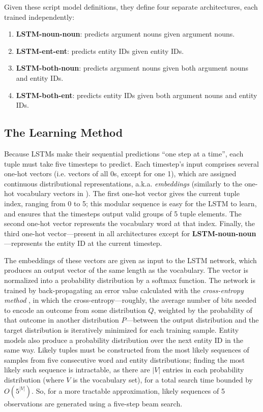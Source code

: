 Given these script model definitions, they define four separate architectures, each trained independently:

\begin{enumerate}
    \item \textbf{LSTM-noun-noun}: predicts argument nouns given argument nouns.
    \item \textbf{LSTM-ent-ent}: predicts entity IDs given entity IDs.
    \item \textbf{LSTM-both-noun}: predicts argument nouns given both argument nouns and entity IDs.
    \item \textbf{LSTM-both-ent}: predicts entity IDs given both argument nouns and entity IDs.
\end{enumerate}

\subsection{The Learning Method}
Because LSTMs make their sequential predictions ``one step at a time'', each tuple must take five timesteps to predict. Each timestep's input comprises several one-hot vectors (i.e. vectors of all 0s, except for one 1), which are assigned continuous distributional representations, a.k.a. \textit{embeddings} (similarly to the one-hot vocabulary vectors in \citep{mikolov2013}). The first one-hot vector gives the current tuple index, ranging from 0 to 5; this modular sequence is easy for the LSTM to learn, and ensures that the timesteps output valid groups of 5 tuple elements. The second one-hot vector represents the vocabulary word at that index. Finally, the third one-hot vector---present in all architectures except for \textbf{LSTM-noun-noun}---represents the entity ID at the current timestep.

The embeddings of these vectors are given as input to the LSTM network, which produces an output vector of the same length as the vocabulary. The vector is normalized into a probability distribution by a softmax function. The network is trained by back-propagating an error value calculated with the \textit{cross-entropy method} \citep{rubinstein2013cross}, in which the cross-entropy---roughly, the average number of bits needed to encode an outcome from some distribution $Q$, weighted by the probability of that outcome in another distribution $P$---between the output distribution and the target distribution is iteratively minimized for each training sample. Entity models also produce a probability distribution over the next entity ID in the same way. Likely tuples must be constructed from the most likely sequences of samples from five consecutive word and entity distributions; finding the most likely such sequence is intractable, as there are $|V|$ entries in each probability distribution (where $V$ is the vocabulary set), for a total search time bounded by $O(5^{|V|})$. So, for a more tractable approximation, likely sequences of 5 observations are generated using a five-step beam search.

